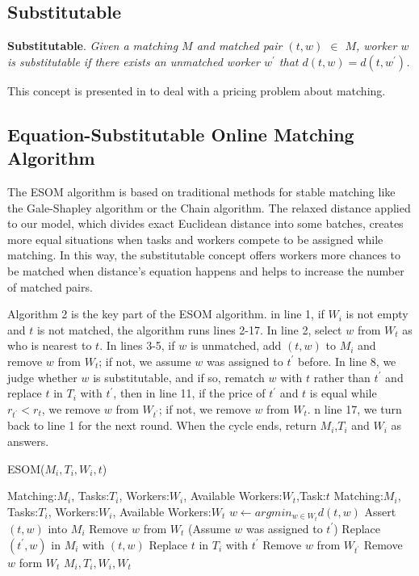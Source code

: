 \documentclass[color,twoside,amssymb,twocolumn]{article}
\begin{document}
\subsection{Substitutable}

\textbf{Substitutable\cite{xia2017revenue}}. {\it Given a matching $M$ and matched pair $(t,w)$ $\in$ $M$, worker $w$ is substitutable if there exists an unmatched worker $w^{'}$ that $d(t,w)=d(t,w^{'})$.}

This concept is presented in \cite{xia2017revenue} to deal with a pricing problem about matching.

\subsection{Equation-Substitutable Online Matching Algorithm}

The ESOM algorithm is based on traditional methods for stable matching like the Gale-Shapley algorithm or the Chain algorithm. The relaxed distance applied to our model, which divides exact Euclidean distance into some batches, creates more equal situations when tasks and workers compete to be assigned while matching. In this way, the substitutable concept offers workers more chances to be matched when distance's equation happens and helps to increase the number of matched pairs.

Algorithm 2 is the key part of the ESOM algorithm. in line 1, if $W_i$ is not empty and $t$ is not matched, the algorithm runs lines 2-17. In line 2, select $w$ from $W_t$ as who is nearest to $t$. In lines 3-5, if $w$ is unmatched, add $(t,w)$ to $M_i$ and remove $w$ from $W_t$; if not, we assume $w$ was assigned to $t^{'}$ before. In line 8, we judge whether $w$ is substitutable, and if so, rematch $w$ with $t$ rather than $t^{'}$ and replace $t$ in $T_i$ with $t^{'}$, then in line 11, if the price of $t^{'}$ and $t$ is equal while $r_{t^{'}} < r_t$, we remove $w$ from $W_{t^{'}}$; if not, we remove $w$ from $W_t$. n line 17, we turn back to line 1 for the next round. When the cycle ends, return $M_i$,$T_i$ and $W_i$ as answers.

\begin{algorithm}[h]
	\caption{ESOM($M_i,T_i,W_i,t$)}
	\label{alg2}
	\begin{algorithmic}[1]
		\REQUIRE Matching:$M_i$, Tasks:$T_i$, Workers:$W_i$, Available Workers:$W_t$,Task:$t$
		\ENSURE Matching:$M_i$, Tasks:$T_i$, Workers:$W_i$, Available Workers:$W_t$
		\STATE $w \leftarrow argmin_{w\in W_t}d(t,w)$
		\STATE Assert $(t,w)$ into $M_i$
		\STATE Remove $w$ from $W_t$
		\ELSE
		\STATE (Assume $w$ was assigned to $t^{'}$)
		\STATE Replace $(t^{'},w)$ in $M_i$ with $(t,w)$
		\STATE Replace $t$ in $T_i$ with $t^{'}$
		\STATE Remove $w$ from $W_{t^{'}}$
		\ENDIF
		\ELSE 
		\STATE Remove $w$ form $W_t$
		\ENDIF
		\ENDIF
		\ENDWHILE
		\RETURN $M_i,T_i,W_i,W_t$
	\end{algorithmic} 
\end{algorithm}
\end{document}
